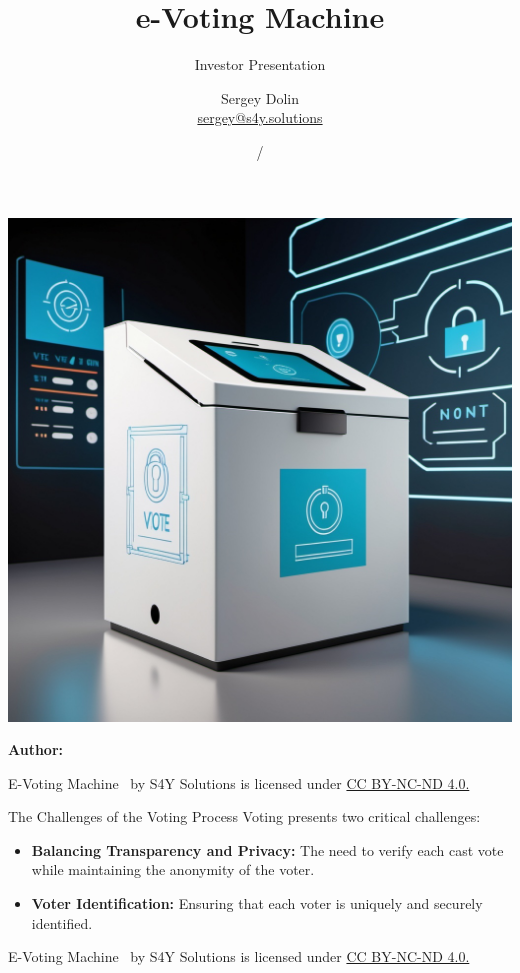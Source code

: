 \documentclass[12pt]{beamer}
\title[Insitute]{e-Voting Machine}
\subtitle{Investor Presentation}
\author[Sergey Dolin]{Sergey Dolin \\
\href{mailto:sergey@s4y.solutions}{\scriptsize{sergey@s4y.solutions}} \\ }
\institute[Institute]{S4Y Solutions}
\date{\prevyear/\currentyear} %
\newcommand{\currentyear}{\the\year} %
\newcommand{\copyrightnote}{
    \vfill
    \begin{flushleft}
    \tiny
    E-Voting Machine \textcopyright \currentyear~by S4Y Solutions is licensed under \href{https://creativecommons.org/licenses/by-nc-nd/4.0}{CC BY-NC-ND 4.0.}
    \end{flushleft}
}
\begin{document}
    \begin{frame}{}
        \vspace{\fill}

        \includegraphics[width=0.16\linewidth]{voting-machine}

        \vspace{\fill}

        \Large
        \color{main}
        \inserttitle

        \medskip

        \large
        \color{black}
        \insertsubtitle

        \vspace{\fill}

        \footnotesize
        \insertinstitute

        \vspace{\fill}

        \textbf{Author:} \insertauthor

        \medskip

        \insertdate

        \vspace{\fill}
        \copyrightnote
    \end{frame}

    \begin{frame}[allowframebreaks]{The Challenges of the Voting Process}
        \vfill
        Voting presents two critical challenges:

        \begin{itemize}
            \item \textbf{Balancing Transparency and Privacy:} The need to verify each cast vote while maintaining the anonymity of the voter.
            \item \textbf{Voter Identification:} Ensuring that each voter is uniquely and securely identified.
        \end{itemize}
        \copyrightnote
    \end{frame}
\end{document}
